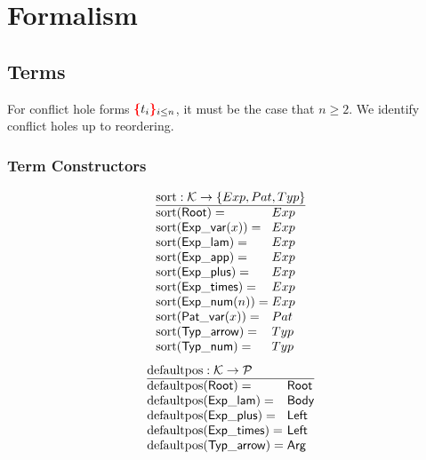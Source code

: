 \section{Formalism}


\subsection{Terms}

\figureTermSyntaxContent

For conflict hole forms $\textcolor{red}{\textbf{\{}}t_i\textcolor{red}{\textbf{\}}}_{i \leq n}$, it must be the case that $n \geq 2$.
We identify conflict holes up to reordering.


\subsubsection{Term Constructors}

\[
  \arraycolsep=0pt
  \begin{array}{ll}
    \multicolumn{2}{l}{\sortOp : \K \to \SetOf{Exp, Pat, Typ}} \\
    \hline
    \sort{\Root}={} & Exp \\
    \sort{\ExpVar(x)}={} & Exp \\
    \sort{\ExpLam}={} & Exp \\
    \sort{\ExpApp}={} & Exp \\
    \sort{\ExpPlus}={} & Exp \\
    \sort{\ExpTimes}={} & Exp \\
    \sort{\ExpNum(n)}={} & Exp \\
    \sort{\PatVar(x)}={} & Pat \\
    \sort{\TypArrow}={} & Typ \\
    \sort{\TypNum}={} & Typ \\
  \end{array}
\]
%
\figureArityContent
%
\[
  \arraycolsep=0pt
  \begin{array}{ll}
    \multicolumn{2}{l}{\defaultposOp : \K \to \P} \\
    \hline
    \defaultpos{\Root}={} & \Root \\
    \defaultpos{\ExpLam}={} & \LamBody \\
    \defaultpos{\ExpPlus}={} & \PlusLeft \\
    \defaultpos{\ExpTimes}={} & \TimesLeft \\
    \defaultpos{\TypArrow}={} & \ArrowArg \\
  \end{array}
\]

